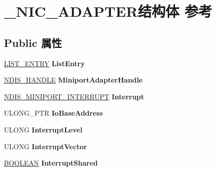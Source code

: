 \hypertarget{struct___n_i_c___a_d_a_p_t_e_r}{}\section{\+\_\+\+N\+I\+C\+\_\+\+A\+D\+A\+P\+T\+E\+R结构体 参考}
\label{struct___n_i_c___a_d_a_p_t_e_r}
\subsection*{Public 属性}
\begin{DoxyCompactItemize}
\item 
\mbox{\label{struct___n_i_c___a_d_a_p_t_e_r_ade64ba5ff6bbe12a52541a4abee33ee0}} 
\hyperlink{struct___l_i_s_t___e_n_t_r_y}{L\+I\+S\+T\+\_\+\+E\+N\+T\+RY} {\bfseries List\+Entry}
\item 
\mbox{\label{struct___n_i_c___a_d_a_p_t_e_r_ad648719cdbe70cd3768922631b475e67}} 
\hyperlink{interfacevoid}{N\+D\+I\+S\+\_\+\+H\+A\+N\+D\+LE} {\bfseries Miniport\+Adapter\+Handle}
\item 
\mbox{\label{struct___n_i_c___a_d_a_p_t_e_r_a81f0286cec78fd59a692e3fcca30cfee}} 
\hyperlink{struct___n_d_i_s___m_i_n_i_p_o_r_t___i_n_t_e_r_r_u_p_t}{N\+D\+I\+S\+\_\+\+M\+I\+N\+I\+P\+O\+R\+T\+\_\+\+I\+N\+T\+E\+R\+R\+U\+PT} {\bfseries Interrupt}
\item 
\mbox{\label{struct___n_i_c___a_d_a_p_t_e_r_abf5b2b5aeb256041183c2be4b97ad576}} 
U\+L\+O\+N\+G\+\_\+\+P\+TR {\bfseries Io\+Base\+Address}
\item 
\mbox{\label{struct___n_i_c___a_d_a_p_t_e_r_a052aa4a718a41ec4847deeec9c90d292}} 
U\+L\+O\+NG {\bfseries Interrupt\+Level}
\item 
\mbox{\label{struct___n_i_c___a_d_a_p_t_e_r_a9afb622145e7eb0366391b5ad76026c3}} 
U\+L\+O\+NG {\bfseries Interrupt\+Vector}
\item 
\mbox{\label{struct___n_i_c___a_d_a_p_t_e_r_a50c962ba12286aa8a1c0e72d7dd83d1c}} 
\hyperlink{_processor_bind_8h_a112e3146cb38b6ee95e64d85842e380a}{B\+O\+O\+L\+E\+AN} {\bfseries Interrupt\+Shared}

\end{DoxyCompactItemize}

